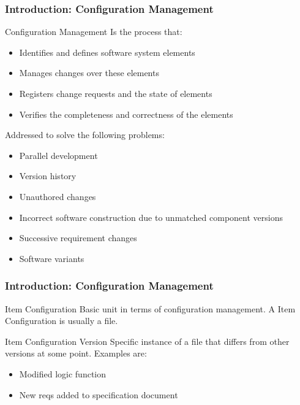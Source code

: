 \begin{frame}

\frametitle{Introduction: Configuration Management}

\begin{block}{Configuration Management}
Is the process that:
\begin{itemize}
\item Identifies and defines software system elements
\item Manages changes over these elements
\item Registers change requests and the state of elements
\item Verifies the completeness and correctness of the elements
\end{itemize}
\end{block}

Addressed to solve the following problems:
\begin{multicols}{2}

\begin{itemize}
\item Parallel development
\item Version history
\item Unauthored changes
\item Incorrect software construction due to unmatched component versions
\columnbreak
\item Successive requirement changes
\item Software variants

\end{itemize}

\end{multicols}

\end{frame}

\begin{frame}

\frametitle{Introduction: Configuration Management}

\begin{block}{Item Configuration}
Basic unit in terms of configuration management. A Item Configuration is usually a file.
\end{block}

\begin{block}{Item Configuration Version}
Specific instance of a file that differs from other versions at some point.
Examples are:
\begin{itemize}
\item Modified logic function
\item New reqs added to specification document
\end{itemize}
\end{block}

\end{frame}

